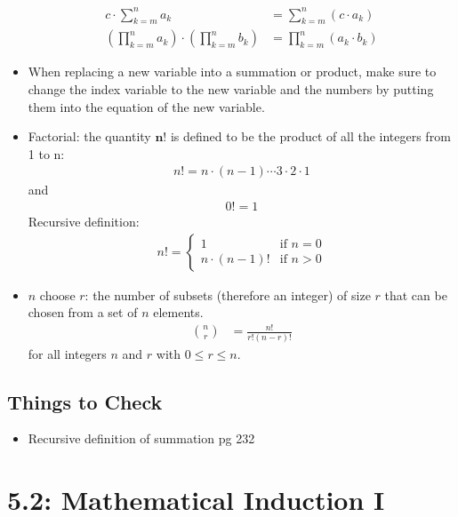 \documentclass{article}
\begin{document}
\begin{itemize}
\begin{align}
                    c \cdot \sum_{k=m}^{n} a_k &= \sum_{k=m}^{n} (c \cdot a_k) \\
                    (\prod_{k=m}^{n} a_k) \cdot (\prod_{k=m}^{n} b_k) &= \prod_{k=m}^{n} (a_k \cdot b_k)
                \end{align}
            \item When replacing a new variable into a summation or product, make sure to change the index variable to the new variable and the numbers by putting them into the equation of the new variable.
            \item Factorial: the quantity $\mathbf{n!}$ is defined to be the product of all the integers from 1 to n:
                \begin{align*}
                    n! = n \cdot (n-1) \cdots 3 \cdot 2 \cdot 1
                \end{align*}
                and
                \begin{align*}
                    0! = 1
                \end{align*}
                Recursive definition:
                \begin{align*}
                    n! = \begin{cases}
                        1 & \text{if } n = 0 \\
                        n \cdot (n-1)! & \text{if } n > 0
                    \end{cases}
                \end{align*}
            \item $n$ choose $r$: the number of subsets (therefore an integer) of size $r$ that can be chosen from a set of $n$ elements.
                \begin{align*}
                    n \choose r &= \frac{n!}{r!(n-r)!}
                \end{align*}
                for all integers $n$ and $r$ with $0 \leq r \leq n$.
        \end{itemize}
    \subsection{Things to Check}
        \begin{itemize}
            \item Recursive definition of summation pg 232
        \end{itemize}

\newpage \section{5.2: Mathematical Induction I}
\end{document}
